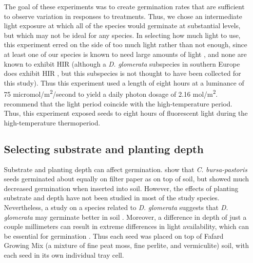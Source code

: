 \documentclass[12pt]{article}\usepackage[]{graphicx}\usepackage[]{color}
\begin{document}
	The goal of these experiments was to create germination rates that are sufficient to observe variation in responses to treatments. Thus, we chose an intermediate light exposure at which all of the species would germinate at substantial levels, but which may not be ideal for any species. In selecting how much light to use, this experiment erred on the side of too much light rather than not enough, since at least one of our species is known to need large amounts of light \parencite[\textit{Plantago major}---][]{Pons1991}, and none are known to exhibit HIR (although a \textit{D. glomerata} subspecies in southern Europe does exhibit HIR \parencite{Probert1986}, but this subspecies is not thought to have been collected for this study). Thus this experiment used a length of eight hours at a luminance of 75 micromol/m\textsuperscript{2}/second to yield a daily photon dosage of 2.16 mol/m\textsuperscript{2}. \textcite{Baskin1998} recommend that the light period coincide with the high-temperature period. Thus, this experiment exposed seeds to eight hours of fluorescent light during the high-temperature thermoperiod. 
	
\subsection{Selecting substrate and planting depth} 
Substrate and planting depth can affect germination. \textcite{Popay1970} show that \textit{C. bursa-pastoris} seeds germinated about equally on filter paper as on top of soil, but showed much decreased germination when inserted into soil. However, the effects of planting substrate and depth have not been studied in most of the study species. Nevertheless, a study on a species related to \textit{D. glomerata} suggests that \textit{D. glomerata} may germinate better in soil \parencite{Andrews1974}. Moreover, a difference in depth of just a couple millimeters can result in extreme differences in light availability, which can be essential for germination \parencite{Tester1987}. Thus each seed was placed on top of Fafard Growing Mix (a mixture of fine peat moss, fine perlite, and vermiculite) soil, with each seed in its own individual tray cell.
\printbibliography
\end{document}
